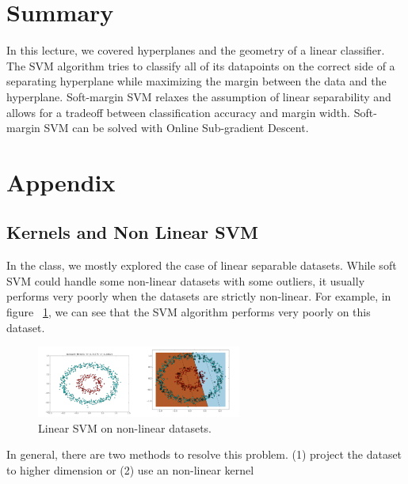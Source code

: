 \documentclass[11pt]{article}
\begin{document}
\section{Summary}
In this lecture, we covered hyperplanes and the geometry of a linear classifier. The SVM algorithm tries to classify all of its datapoints on the correct side of a separating hyperplane while maximizing the margin between the data and the hyperplane. Soft-margin SVM relaxes the assumption of linear separability and allows for a tradeoff between classification accuracy and margin width. Soft-margin SVM can be solved with Online Sub-gradient Descent.

\section{Appendix}
\subsection{Kernels and Non Linear SVM}
In the class, we mostly explored the case of linear separable datasets. While soft SVM could handle some non-linear datasets with some outliers, it usually performs very poorly when the datasets are strictly non-linear. For example, in figure ~\ref{fig:nonlinear}, we can see that the SVM algorithm performs very poorly on this dataset. 
\begin{figure}[H]
    \centering
    \includegraphics[width=0.6\textwidth]{images/nonlinear.png}
    \caption{Linear SVM on non-linear datasets.}
    \label{fig:nonlinear}
\end{figure}
In general, there are two methods to resolve this problem. (1) project the dataset to higher dimension or (2) use an non-linear kernel
\end{document}

